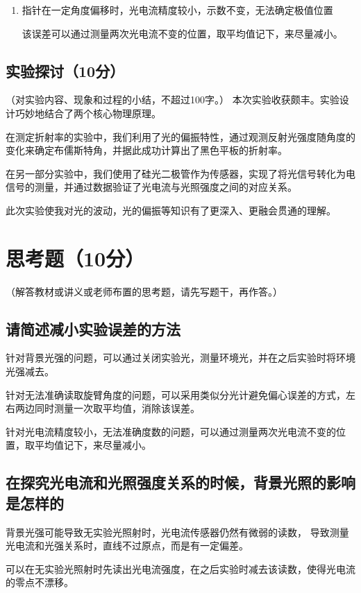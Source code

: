 \documentclass[]{../../templates/Report}%
\begin{document}
\begin{fullreportonly}
\begin{enumerate}[leftmargin = 6em]
    该误差可以类似分光计避免偏心误差的方式，左右两边同时测量一次取平均值，消除该误差。
    \item 指针在一定角度偏移时，光电流精度较小，示数不变，无法确定极值位置

    该误差可以通过测量两次光电流不变的位置，取平均值记下，来尽量减小。
\end{enumerate}
\subsection{实验探讨（10分）}
（对实验内容、现象和过程的小结，不超过100字。）
本次实验收获颇丰。实验设计巧妙地结合了两个核心物理原理。

在测定折射率的实验中，我们利用了光的偏振特性，通过观测反射光强度随角度的变化来确定布儒斯特角，并据此成功计算出了黑色平板的折射率。

在另一部分实验中，我们使用了硅光二极管作为传感器，实现了将光信号转化为电信号的测量，并通过数据验证了光电流与光照强度之间的对应关系。

此次实验使我对光的波动，光的偏振等知识有了更深入、更融会贯通的理解。
\section{思考题（10分）}
（解答教材或讲义或老师布置的思考题，请先写题干，再作答。）
\subsection{请简述减小实验误差的方法}
针对背景光强的问题，可以通过关闭实验光，测量环境光，并在之后实验时将环境光强减去。

针对无法准确读取旋臂角度的问题，可以采用类似分光计避免偏心误差的方式，左右两边同时测量一次取平均值，消除该误差。

针对光电流精度较小，无法准确度数的问题，可以通过测量两次光电流不变的位置，取平均值记下，来尽量减小。
\subsection{在探究光电流和光照强度关系的时候，背景光照的影响是怎样的}
背景光强可能导致无实验光照射时，光电流传感器仍然有微弱的读数，
导致测量光电流和光强关系时，直线不过原点，而是有一定偏差。

可以在无实验光照射时先读出光电流强度，在之后实验时减去该读数，使得光电流的零点不漂移。


\end{fullreportonly}
\end{document}
